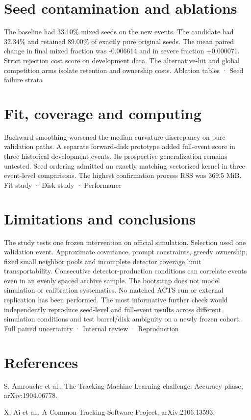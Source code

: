 \documentclass[10pt]{article}
\begin{document}
\section*{Seed contamination and ablations}
The baseline had 33.10\% mixed seeds on the new events. The candidate had 32.34\% and retained 89.00\% of exactly pure original seeds. The mean paired change in final mixed fraction was -0.006614 and in severe fraction +0.000071. Strict rejection cost score on development data. The alternative-hit and global competition arms isolate retention and ownership costs. Ablation tables · Seed failure strata\par
\section*{Fit, coverage and computing}
Backward smoothing worsened the median curvature discrepancy on pure validation paths. A separate forward-disk prototype added full-event score in three historical development events. Its prospective generalization remains untested. Seed ordering admitted an exactly matching vectorized kernel in three event-level comparisons. The highest confirmation process RSS was 369.5 MiB. Fit study · Disk study · Performance\par
\section*{Limitations and conclusions}
The study tests one frozen intervention on official simulation. Selection used one validation event. Approximate covariance, prompt constraints, greedy ownership, fixed small neighbor pools and incomplete detector coverage limit transportability. Consecutive detector-production conditions can correlate events even in an evenly spaced archive sample. The bootstrap does not model simulation or calibration systematics. No matched ACTS run or external replication has been performed. The most informative further check would independently reproduce seed-level and full-event results across different simulation conditions and test barrel/disk ambiguity on a newly frozen cohort. Full paired uncertainty · Internal review · Reproduction\par
\section*{References}
S. Amrouche et al., The Tracking Machine Learning challenge: Accuracy phase, arXiv:1904.06778.
\par X. Ai et al., A Common Tracking Software Project, arXiv:2106.13593.
\end{document}
